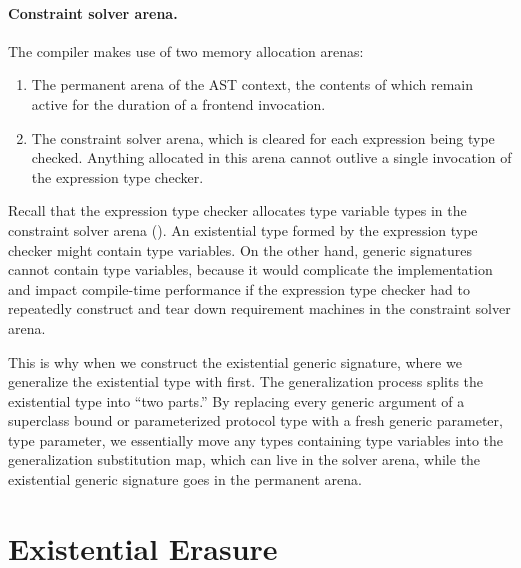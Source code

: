 \documentclass[../generics]{subfiles}
\begin{document}
\paragraph{Constraint solver arena.}
The compiler makes use of two memory allocation arenas:
\begin{enumerate}
\item The permanent arena of the AST context, the contents of which remain active for the duration of a frontend invocation.
\item The constraint solver arena, which is cleared for each expression being type checked. Anything allocated in this arena cannot outlive a single invocation of the expression type checker.
\end{enumerate}
Recall that the expression type checker allocates type variable types in the constraint solver arena (). An existential type formed by the expression type checker might contain type variables. On the other hand, generic signatures cannot contain type variables, because it would complicate the implementation and impact compile-time performance if the expression type checker had to repeatedly construct and tear down requirement machines in the constraint solver arena.

This is why when we construct the existential generic signature, where we generalize the existential type with  first. The generalization process splits the existential type into ``two parts.'' By replacing every generic argument of a superclass bound or parameterized protocol type with a fresh generic parameter, type parameter, we essentially move any types containing type variables into the generalization substitution map, which can live in the solver arena, while the existential generic signature goes in the permanent arena.

\section{Existential Erasure}\label{sec:existential erasure}
\end{document}
